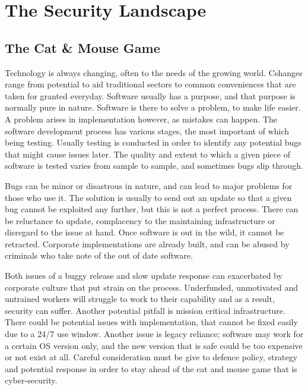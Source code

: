 





\chapter{The Security Landscape}
\section{The Cat \& Mouse Game}
Technology is always changing, often to the needs of the growing world. Cshanges range from potential to aid traditional sectors to common conveniences that are taken for granted everyday.
Software usually has a purpose, and that purpose is normally pure in nature. Software is there to solve a problem, to make life easier. A problem arises in implementation however, as mistakes can happen.
The software development process has various stages, the most important of which being testing. Usually testing is conducted in order to identify any potential bugs that might cause issues later.
The quality and extent to which a given piece of software is tested varies from sample to sample, and sometimes bugs slip through.

Bugs can be minor or disastrous in nature, and can lead to major problems for those who use it.
The solution is usually to send out an update so that a given bug cannot be exploited any further, but this is not a perfect process. There can be reluctance to update, complacency to the maintaining infrastructure or disregard to the issue at hand.
Once software is out in the wild, it cannot be retracted. Corporate implementations are already built, and can be abused by criminals who take note of the out of date software.

Both issues of a buggy release and slow update response can exacerbated by corporate culture that put strain on the process. Underfunded, unmotivated and untrained workers will struggle to work to their capability and as a result, security can suffer. 
Another potential pitfall is mission critical infrastructure. There could be potential issues with implementation, that cannot be fixed easily due to a 24/7 use window. Another issue is legacy reliance; software may work for a certain OS version only, 
and the new version that is safe could be too expensive or not exist at all. Careful consideration must be give to defence policy, strategy and potential response in order to stay ahead of the cat and mouse game that is cyber-security.

